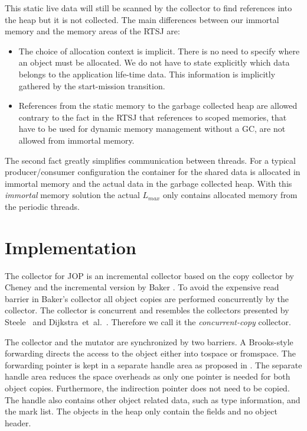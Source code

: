 This static live data will still be scanned by the collector to find
references into the heap but it is not collected. The main
differences between our immortal memory and the memory areas of the
RTSJ are:
\begin{itemize}
    \item The choice of allocation context is implicit. There is
        no need to specify where an object must be allocated. We
        do not have to state explicitly which data belongs to the
        application life-time data. This information is
        implicitly gathered by the start-mission transition.
    \item References from the static memory to the garbage
        collected heap are allowed contrary to the fact in the
        RTSJ that references to scoped memories, that have to be
        used for dynamic memory management without a GC, are not
        allowed from immortal memory.
\end{itemize}

The second fact greatly simplifies communication between threads. For
a typical producer/consumer configuration the container for the
shared data is allocated in immortal memory and the actual data in
the garbage collected heap. With this \emph{immortal} memory solution
the actual $L_{max}$ only contains allocated memory from the periodic
threads.


\section{Implementation}


The collector for JOP is an incremental collector
\cite{jop:rtgc_sched, jop:scjgc} based on the copy collector by
Cheney \cite{gc:cheney70} and the incremental version by Baker
\cite{gc:baker78}. To avoid the expensive read barrier in Baker's
collector all object copies are performed concurrently by the
collector. The collector is concurrent and resembles the collectors
presented by Steele~\cite{gc:steele75} and
Dijkstra~et~al.~\cite{gc:dijkstra78}. Therefore we call it the
\emph{concurrent-copy} collector.

The collector and the mutator are synchronized by two barriers. A
Brooks-style~\cite{gc:broo84} forwarding directs the access to the
object either into tospace or fromspace. The forwarding pointer is
kept in a separate handle area as proposed in \cite{gc:nort87}. The
separate handle area reduces the space overheads as only one pointer
is needed for both object copies. Furthermore, the indirection
pointer does not need to be copied. The handle also contains other
object related data, such as type information, and the mark list. The
objects in the heap only contain the fields and no object header.

